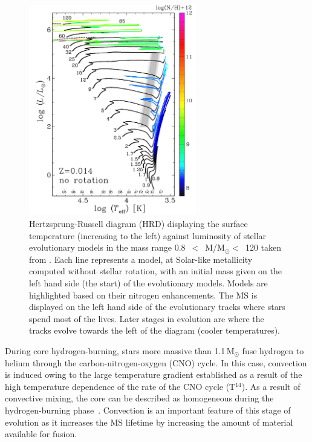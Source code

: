 \begin{figure}
 \centering
 \includegraphics[width=0.65\textwidth]{intro/HRD}
 \caption[Hertzsprung-Russell diagram (HRD) of stars]{
Hertzsprung-Russell diagram (HRD) displaying the surface temperature (increasing to the left) against luminosity of stellar evolutionary models in the mass range
0.8~$<$~M/M$_{\odot}<$~120 taken from
\protect\citet{2012A&A...537A.146E}.
Each line represents a model, at Solar-like metallicity computed without stellar rotation, with an initial mass given on the left hand side (the start) of the evolutionary models.
Models are highlighted based on their nitrogen enhancements.
The MS is displayed on the left hand side of the evolutionary tracks where stars spend most of the lives.
Later stages in evolution are where the tracks evolve towards the left of the diagram (cooler temperatures).
 \label{fig:HRD}}
\end{figure}


During core hydrogen-burning, stars more massive than 1.1\,M$_{\odot}$ fuse hydrogen to helium through the carbon-nitrogen-oxygen (CNO) cycle.
In this case, convection is induced owing to the large temperature gradient established as a result of the high temperature dependence of the rate of the CNO cycle (T$^{14}$).
As a result of convective mixing, the core can be described as homogeneous during the hydrogen-burning phase~\citep{2012sse..book.....K}.
Convection is an important feature of this stage of evolution as it increases the MS lifetime by increasing the amount of material available for fusion.

